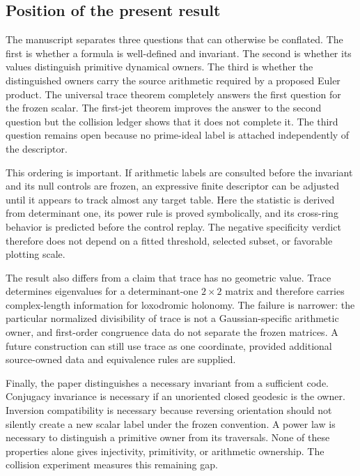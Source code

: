 \documentclass[11pt,a4paper]{article}
\theoremstyle{definition}
\theoremstyle{remark}
\begin{document}
\subsection{Position of the present result}

The manuscript separates three questions that can otherwise be conflated. The first is whether a formula is well-defined and invariant. The second is whether its values distinguish primitive dynamical owners. The third is whether the distinguished owners carry the source arithmetic required by a proposed Euler product. The universal trace theorem completely answers the first question for the frozen scalar. The first-jet theorem improves the answer to the second question but the collision ledger shows that it does not complete it. The third question remains open because no prime-ideal label is attached independently of the descriptor.

This ordering is important. If arithmetic labels are consulted before the invariant and its null controls are frozen, an expressive finite descriptor can be adjusted until it appears to track almost any target table. Here the statistic is derived from determinant one, its power rule is proved symbolically, and its cross-ring behavior is predicted before the control replay. The negative specificity verdict therefore does not depend on a fitted threshold, selected subset, or favorable plotting scale.

The result also differs from a claim that trace has no geometric value. Trace determines eigenvalues for a determinant-one \(2\times2\) matrix and therefore carries complex-length information for loxodromic holonomy. The failure is narrower: the particular normalized divisibility of trace is not a Gaussian-specific arithmetic owner, and first-order congruence data do not separate the frozen matrices. A future construction can still use trace as one coordinate, provided additional source-owned data and equivalence rules are supplied.

Finally, the paper distinguishes a necessary invariant from a sufficient code. Conjugacy invariance is necessary if an unoriented closed geodesic is the owner. Inversion compatibility is necessary because reversing orientation should not silently create a new scalar label under the frozen convention. A power law is necessary to distinguish a primitive owner from its traversals. None of these properties alone gives injectivity, primitivity, or arithmetic ownership. The collision experiment measures this remaining gap.
\end{document}
